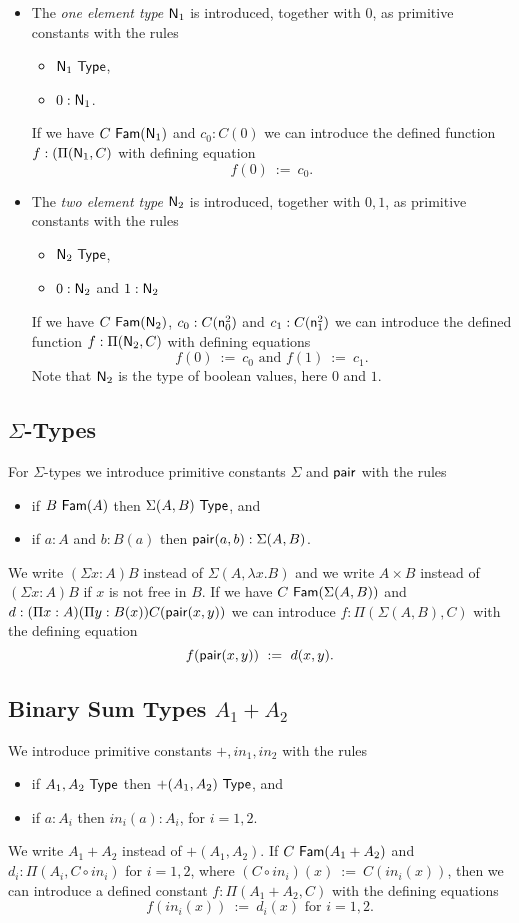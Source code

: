 {{\begin{itemize}
\medskip

\item The {\em one element type} ${\sf N}_1$ is introduced, together with $0$, as primitive constants with the rules
\begin{itemize}
\item ${\sf N}_1~{\sf Type}$,
\item $0:{\sf N}_1$.
\end{itemize}
If we have $C~{\sf Fam}({\sf N}_1)$ and $c_0:C(0)$ we can introduce the defined function 
$f:(\Pi({\sf N}_1,C)$ with defining equation
  \[ f(0)~:=~c_0.\]
\item The {\em two element type} ${\sf N}_2$ is introduced, together with $0,1$, as primitive constants with the rules
\begin{itemize}
\item ${\sf N}_2~{\sf Type}$,
\item $0:{\sf N}_2$ and $1:{\sf N}_2$
\end{itemize}
If we have $C~{\sf Fam}({\sf N}_2)$, $c_0:C({\sf n}^2_0)$ and $c_1:C({\sf n}^2_1)$ we can introduce the defined function 
$f:\Pi({\sf N}_2,C)$ with defining equations
  \[ f(0)~:=~c_0\mbox{ and }f(1)~:=~ c_1.\]
Note that ${\sf N}_2$ is the type of boolean values, here $0$ and $1$.
\end{itemize}
}%

\subsection*{$\Sigma$-Types}
For $\Sigma$-types we introduce primitive constants $\Sigma$ and ${\sf pair}$ with the rules
\begin{itemize}
\item if $B~{\sf Fam}(A)$ then $\Sigma(A,B)~{\sf Type}$, and
\item if $a:A$ and $b:B(a)$ then ${\sf pair}(a,b):\Sigma(A,B)$.
\end{itemize}
We write $(\Sigma x:A)B$ instead
of $\Sigma(A,\lambda x.B)$ and we write $A\times B$ instead of $(\Sigma x:A)B$ if
$x$ is not free in $B$.  If we have $C~{\sf Fam}(\Sigma(A,B))$ and
$
d:(\Pi x:A)(\Pi y:B(x))C({\sf pair}(x,y))
$
we can introduce $f:\Pi(\Sigma(A,B),C)$ with the defining equation
$$
f({\sf pair}(x,y))~:=~d(x,y).
$$

\medskip

\subsection*{Binary Sum Types $A_1+A_2$}
We introduce primitive constants $+,in_1,in_2$ with the rules
\begin{itemize}
\item if $A_1,A_2~{\sf Type}$ then $+(A_1,A_2)~{\sf Type}$, and
\item if $a:A_i$ then $in_i(a):A_i$, for $i=1,2$.
\end{itemize}
We write $A_1+A_2$ instead of $+(A_1,A_2)$.
If $C~{\sf Fam}(A_1+A_2)$ and $d_i:\Pi(A_i,C\circ in_i)$ for $i=1,2$, where 
$(C\circ in_i)(x)~:=~C(in_i(x))$, then we can introduce a defined constant $f:\Pi(A_1+A_2,C)$ with the defining equations
  \[ f(in_i(x))~:= ~d_i(x)\mbox{ for } i=1,2.\]

}
